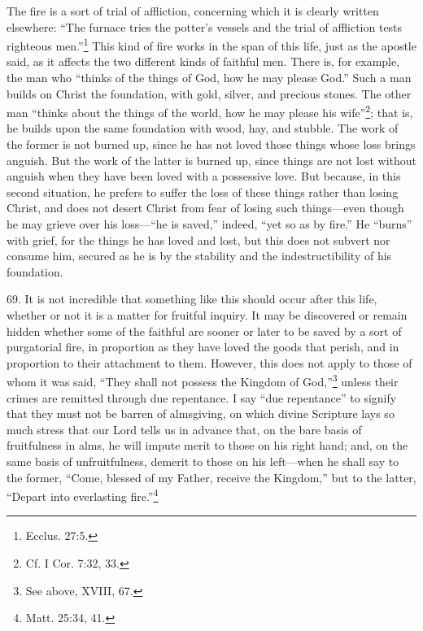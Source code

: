 The fire is a sort of trial of affliction, concerning which it is clearly written elsewhere: ``The furnace tries the potter's vessels and the trial of affliction tests righteous men.''\footnote{Ecclus. 27:5.} This kind of fire works in the span of this life, just as the apostle said, as it affects the two different kinds of faithful men. There is, for example, the man who ``thinks of the things of God, how he may please God.'' Such a man builds on Christ the foundation, with gold, silver, and precious stones. The other man ``thinks about the things of the world, how he may please his wife''\footnote{Cf. I Cor. 7:32, 33.}; that is, he builds upon the same foundation with wood, hay, and stubble. The work of the former is not burned up, since he has not loved those things whose loss brings anguish. But the work of the latter is burned up, since things are not lost without anguish when they have been loved with a possessive love. But because, in this second situation, he prefers to suffer the loss of these things rather than losing Christ, and does not desert Christ from fear of losing such things—even though he may grieve over his loss—``he is saved,'' indeed, ``yet so as by fire.'' He ``burns'' with grief, for the things he has loved and lost, but this does not subvert nor consume him, secured as he is by the stability and the indestructibility of his foundation.

69. It is not incredible that something like this should occur after this life, whether or not it is a matter for fruitful inquiry. It may be discovered or remain hidden whether some of the faithful are sooner or later to be saved by a sort of purgatorial fire, in proportion as they have loved the goods that perish, and in proportion to their attachment to them. However, this does not apply to those of whom it was said, ``They shall not possess the Kingdom of God,''\footnote{See above, XVIII, 67.} unless their crimes are remitted through due repentance. I say ``due repentance'' to signify that they must not be barren of almsgiving, on which divine Scripture lays so much stress that our Lord tells us in advance that, on the bare basis of fruitfulness in alms, he will impute merit to those on his right hand; and, on the same basis of unfruitfulness, demerit to those on his left—when he shall say to the former, ``Come, blessed of my Father, receive the Kingdom,'' but to the latter, ``Depart into everlasting fire.''\footnote{Matt. 25:34, 41.}



